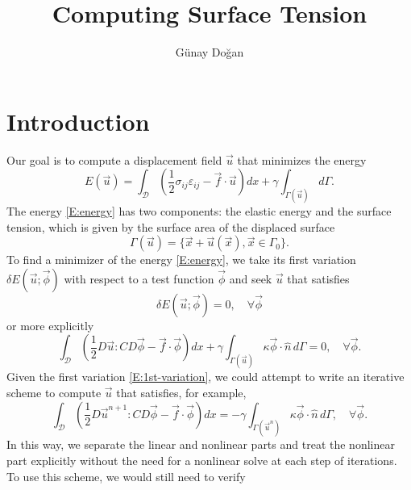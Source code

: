 \documentclass[10pt,a4paper]{article}
\author{G\"unay Do\u gan}
\title{Computing Surface Tension}
\begin{document}
\maketitle

\section{Introduction}

Our goal is to compute a displacement field $\vec{u}$ that minimizes
the energy
%
\begin{equation}\label{E:energy}
E(\vec{u}) = \int_\mathcal{D} \left( \frac{1}{2}\sigma_{ij}\varepsilon_{ij} 
-\vec{f}\cdot\vec{u} \right) dx + \gamma \int_{\Gamma(\vec{u})} d\Gamma.
\end{equation}
%
The energy \eqref{E:energy} has two components: the elastic energy and 
the surface tension, which is given by the surface area of 
the displaced surface
%
\begin{equation}\label{E:displaced-surface}
\Gamma(\vec{u}) = \{\vec{x} + \vec{u}(\vec{x}), \vec{x} \in \Gamma_0 \}.
\end{equation}
%
To find a minimizer of the energy \eqref{E:energy}, we take 
its first variation $\delta E(\vec{u};\vec{\phi})$ 
with respect to a test function $\vec{\phi}$ and seek 
$\vec{u}$ that satisfies
\[
\delta E(\vec{u};\vec{\phi}) = 0, \quad \forall \vec{\phi}
\]
or more explicitly
%
\begin{equation}\label{E:1st-variation}
\int_\mathcal{D} \left( \frac{1}{2} D\vec{u}:C D\vec{\phi} 
- \vec{f}\cdot\vec{\phi} \right) dx 
+ \gamma \int_{\Gamma(\vec{u})} \kappa \vec{\phi}\cdot\hat{n} \, d\Gamma = 0,
\quad \forall \vec{\phi}.
\end{equation}
%
Given the first variation \eqref{E:1st-variation}, we could
attempt to write an iterative scheme to compute $\vec{u}$
that satisfies, for example,
%
\begin{equation}\label{E:1st-iterative-scheme}
\int_\mathcal{D} \left( \frac{1}{2} D\vec{u}^{n+1}:C D\vec{\phi} 
- \vec{f}\cdot\vec{\phi} \right) dx 
= -\gamma \int_{\Gamma(\vec{u}^n)} \kappa \vec{\phi}\cdot\hat{n} \, d\Gamma,
\quad \forall \vec{\phi}.
\end{equation}
%
In this way, we separate the linear and nonlinear parts
and treat the nonlinear part explicitly without the need
for a nonlinear solve at each step of iterations.
To use this scheme, we would still need to verify 
\end{document}
